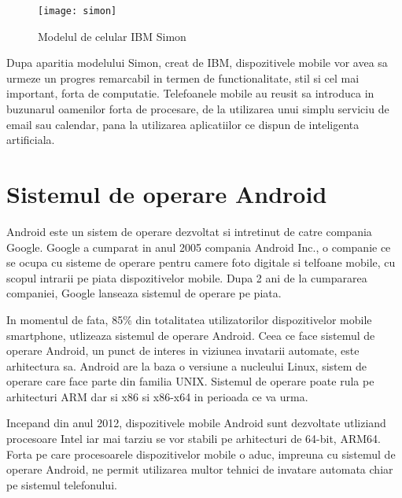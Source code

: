 	
	
		\begin{figure}[H]
		\texttt{[image: simon]}  
		\caption{\label{fig:simon} Modelul de celular IBM Simon
			\protect
			\footnotemark}
	\end{figure}
	
	
	Dupa aparitia modelului Simon, creat de IBM, dispozitivele mobile vor avea sa urmeze un progres remarcabil in termen de functionalitate, stil si cel mai important, forta de computatie. 
	Telefoanele mobile au reusit sa introduca in buzunarul oamenilor forta de procesare, de la utilizarea unui simplu serviciu de email sau calendar, pana la utilizarea aplicatiilor ce dispun de inteligenta artificiala. \cite{history_cellphones}
	
	\vfill
	\section{Sistemul de operare Android}
	Android este un sistem de operare dezvoltat si intretinut de catre compania Google. Google a cumparat in anul 2005 compania Android Inc., o companie ce se ocupa cu sisteme de operare pentru camere foto digitale si telfoane mobile, cu scopul intrarii pe piata dispozitivelor mobile. Dupa 2 ani de la cumpararea companiei, Google lanseaza sistemul de operare pe piata. 
	
	In momentul de fata, 85\% din totalitatea utilizatorilor dispozitivelor mobile smartphone, utlizeaza sistemul de operare Android. 
	Ceea ce face sistemul de operare Android, un punct de interes in viziunea invatarii automate, este arhitectura sa. Android are la baza o versiune a nucleului Linux, sistem de operare care face parte din familia UNIX. Sistemul de operare poate rula pe arhitecturi ARM dar si x86 si x86-x64 in perioada ce va urma. 
	
	Incepand din anul 2012, dispozitivele mobile Android sunt dezvoltate utliziand procesoare Intel iar mai tarziu se vor stabili pe arhitecturi de 64-bit, ARM64. 
	Forta pe care procesoarele dispozitivelor mobile o aduc, impreuna cu sistemul de operare Android, ne permit utilizarea multor tehnici de invatare automata chiar pe sistemul telefonului. 
	
	

